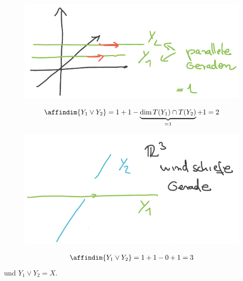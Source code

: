 \begin{beispiel*}[\( X=\reals^3 \)]
    \begin{figure}[H]
        \centering
        \includegraphics[width=0.5\linewidth]{figures/verbindungsraum_parallele_geraden}
        \label{fig:verbindungsraum_parallele_geraden}
    \end{figure}
    \begin{align*}
        \affindim{Y_1\vee Y_2}=1+1-\underbrace{\dim{}{T(Y_1)\cap T(Y_2)}}_{=1}+1=2
    \end{align*}
    \begin{figure}[H]
        \centering
        \includegraphics[width=0.6\linewidth]{figures/verbindungsraum_windschiefe_geraden}
        \label{fig:verbindungsraum_windschiefe_geraden}
    \end{figure}
    \begin{align*}
        \affindim{Y_1\vee Y_2}=1+1-0+1=3
    \end{align*}
    und \( Y_1\vee Y_2=X \).
    
\end{beispiel*}
